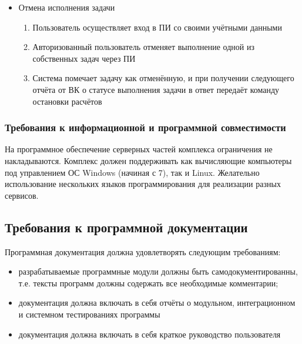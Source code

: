 \documentclass[a4paper,12pt]{report}
\numberwithin{equation}{section}
\begin{document}
\begin{itemize}
    \item Отмена исполнения задачи
    \begin{enumerate}
        \item Пользователь осуществляет вход в ПИ со своими учётными данными
        \item Авторизованный пользователь отменяет выполнение одной из собственных задач через ПИ
        \item Система помечает задачу как отменённую, и при получении следующего отчёта от ВК о статусе выполнения задачи в ответ передаёт команду остановки расчётов
    \end{enumerate}
\end{itemize}

\subsubsection{Требования к информационной и программной совместимости}
На программное обеспечение серверных частей комплекса ограничения не накладываются.
Комплекс должен поддерживать как вычисляющие компьютеры под управлением ОС Windows (начиная с 7), так и Linux.
Желательно использование нескольких языков программирования для реализации разных сервисов.

\subsection{Требования к программной документации}
Программная документация должна удовлетворять следующим требованиям:
\begin{itemize}
  \item разрабатываемые программные модули должны быть самодокументированны, т.е. тексты программ должны содержать все необходимые комментарии;
  \item документация должна включать в себя отчёты о модульном, интеграционном и системном тестированиях программы
  \item документация должна включать в себя краткое руководство пользователя
\end{itemize}
\end{document}
